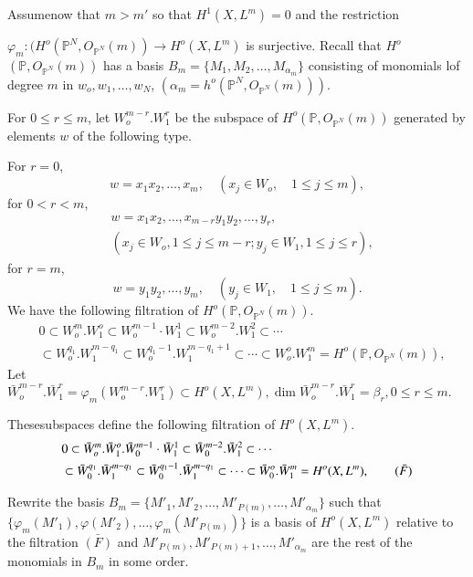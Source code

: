 Assume\pageoriginale now that $m > m'$ so that $H^1 (X,L^m)=0$ and the
restriction  

$\varphi_m : (H^o( \mathbb{P}^N, O_{\mathbb{P}^N}(m)) \to H^o
(X,L^m)$ is surjective. Recall that $H^o$\break $( \mathbb{P},
O_{\mathbb{P}^N}(m))$ has a basis $B_m = \{M_1, M_2 , \ldots , 
M_{\alpha_m}\}$ consisting of monomials lof degree $m$ in $w_o, w_1,
\ldots , w_N$, $(\alpha_m = h^o(\mathbb{P}^N, O_{\mathbb{P}^N}(m)))$. 

For $0 \le r  \le m$, let $W_o^{m-r}. W^r_1$ be the subspace of
$H^o(\mathbb{P}, O_{\mathbb{P}^N}(m))$ generated by elements $w$ of
the following type.  

For $r=0$,
$$
w= x_1x_2, \ldots , x_m , \quad (x_j \in W_o , \quad 1 \le j \le m),
$$
for $0 < r < m$,
\begin{align*}
&w = x_1 x_2 , \ldots , x_{m-r} y_1 y_2, \ldots , y_r,\\  
&(x_j \in
W_o , 1 \le j \le m-r; y_j \in W_1,  1 \le j \le r), 
\end{align*}
for $r = m$,
$$
w = y_1 y_2 , \dots , y_m, \quad (y_j \in W_1,  \quad 1 \le j \le m). 
$$ 
We have the following filtration of $H^o(\mathbb{P},
O_{\mathbb{P}^N}(m))$.   
\begin{align*}
& 0 \subset W^m_o. W^o_1 \subset W_o^{m-1} \cdot W_1^1 \subset
W^{m-2}_o. W^2_1 \subset \cdots \\
& \subset W_o^{q_1}. W^{m-q_1}_1 \subset
W_o^{q_1-1}. W_1^{m-q_1+1}\subset \cdots \subset  W_o^o. W^m_1 =
H^o(\mathbb{P}, O_{\mathbb{P}^N}(m)), \tag*{(F)} 
\end{align*}
Let $\bar{W}_o^{m-r}. \bar{W}^r_1 = \varphi_m (W_o^{m-r}. W^r_1)
\subset H^o (X,L^m), \dim \bar{W}_o^{m-r}. \bar{W}^r_1 = \beta_r, 0
\le r \le m$. 


\noindent
These\pageoriginale subspaces define the following filtration of 
$H^o(X, L^m)$.  
\begin{align*}
& 0 \subset \bar{W}^m_o.  \bar{W}^o_1. \bar{W}^{m-1}_0 \cdot \bar{W}^{1}_1 \subset
\bar{W}^{m-2}_0. \bar{W}^2_1 \subset \cdots\\
&  \subset \bar{W}^{q_1}_0. \bar{W}_1^{m-q_1} \subset
\bar{W}_0^{q_1-1}. \bar{W}^{m-q_1}_1 \subset \cdots \subset
\bar{W}^o_0. \bar{W}^{m}_1 = H^o (X,L^m),   \tag*{$(\bar{F})$} 
\end{align*}

\noindent
Rewrite the basis $B_m = \{M'_1, M'_2, \ldots, M'_{P(m)}, \ldots ,
M'_{\alpha_m}\}$ such that \break $\{\varphi_m (M'_1), \varphi(M'_2), \ldots
, \varphi_m (M'_{P(m)})\}$ is a basis of $H^o (X,L^m)$ relative to the
filtration  $\bar{(F)}$ and $M'_{P(m)}, M'_{P(m)+1} , \ldots ,
M'_{\alpha_m}$ are the rest of the monomials in $B_m$ in some order. 

